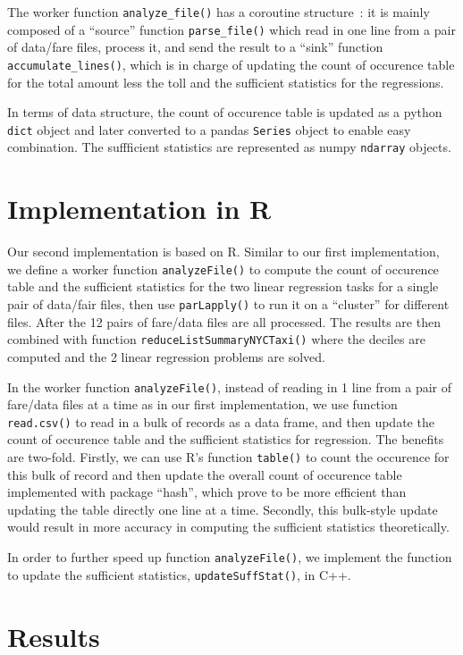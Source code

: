\documentclass{article}
\begin{document}
The worker function \texttt{analyze\_file()} has a coroutine
structure~\cite{}: it is mainly composed of a ``source'' function
\texttt{parse\_file()} which read in one line from a pair of data/fare files,
process it, and send the result to a ``sink'' function
\texttt{accumulate\_lines()}, which is in charge of updating the count of
occurence table for the total amount less the toll and the sufficient statistics
for the regressions.

In terms of data structure, the count of occurence table is updated as a python
\texttt{dict} object and later converted to a pandas \texttt{Series} object to
enable easy combination. The suffficient statistics are represented as numpy
\texttt{ndarray} objects.

\section{Implementation in R}
Our second implementation is based on R. Similar to our first implementation,
we define a worker function \texttt{analyzeFile()} to compute the count of
occurence table and the sufficient statistics for the two linear regression
tasks for a single pair of data/fair files, then use \texttt{parLapply()} to run
it on a ``cluster'' for different files. After the 12 pairs of fare/data files
are all processed. The results are then combined with function
\texttt{reduceListSummaryNYCTaxi()} where the deciles are computed and the 2
linear regression problems are solved.

In the worker function \texttt{analyzeFile()}, instead of reading in 1 line from
a pair of fare/data files at a time as in our first implementation, we use
function \texttt{read.csv()} to read in a bulk of records as a data frame, and
then update the count of occurence table and the sufficient statistics for
regression. The benefits are two-fold. Firstly, we can use R's function
\texttt{table()} to count the occurence for this bulk of record and then update
the overall count of occurence table implemented with package ``hash'', which
prove to be more efficient than updating the table directly one line at a time.
Secondly, this bulk-style update would result in more accuracy in computing the
sufficient statistics theoretically.

In order to further speed up function \texttt{analyzeFile()}, we implement the
function to update the sufficient statistics, \texttt{updateSuffStat()}, in C++.

\section{Results}
\end{document}
